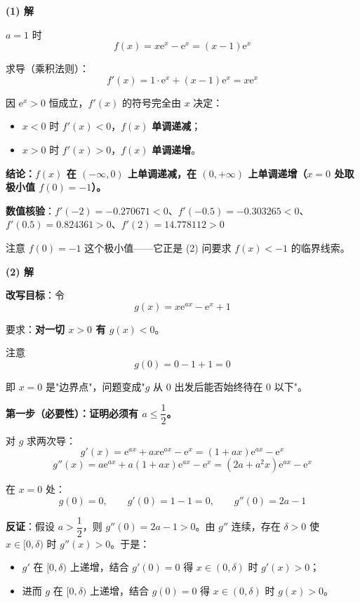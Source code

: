 \par\medskip

\textbf{(1) 解}

$a=1$ 时
\[f(x)=x\mathrm e^{x}-\mathrm e^{x}=(x-1)\mathrm e^{x}\]

求导（乘积法则）：
\[f'(x)=1\cdot\mathrm e^{x}+(x-1)\mathrm e^{x}=x\mathrm e^{x}\]

因 $\mathrm e^{x}>0$ 恒成立，$f'(x)$ 的符号完全由 $x$ 决定：

\begin{itemize}
\item $x<0$ 时 $f'(x)<0$，$f(x)$ \textbf{单调递减}；
\item $x>0$ 时 $f'(x)>0$，$f(x)$ \textbf{单调递增}。
\end{itemize}

\textbf{结论：$f(x)$ 在 $(-\infty,0)$ 上单调递减，在 $(0,+\infty)$ 上单调递增（$x=0$ 处取极小值 $f(0)=-1$）。}

\textbf{数值核验}：$f'(-2)=-0.270671<0$、$f'(-0.5)=-0.303265<0$、$f'(0.5)=0.824361>0$、$f'(2)=14.778112>0$ 

\begin{gktip}
注意 $f(0)=-1$ 这个极小值——它正是 (2) 问要求 $f(x)<-1$ 的临界线索。
\end{gktip}

\par\medskip

\textbf{(2) 解}

\textbf{改写目标}：令
\[g(x)=x\mathrm e^{ax}-\mathrm e^{x}+1\]

要求：\textbf{对一切 $x>0$ 有 $g(x)<0$}。

注意
\[g(0)=0-1+1=0\]

即 $x=0$ 是"边界点"，问题变成"$g$ 从 $0$ 出发后能否始终待在 $0$ 以下"。

\par\medskip

\textbf{第一步（必要性）：证明必须有 $a\le\dfrac12$。}

对 $g$ 求两次导：
\[g'(x)=\mathrm e^{ax}+ax\mathrm e^{ax}-\mathrm e^{x}=(1+ax)\mathrm e^{ax}-\mathrm e^{x}\]
\[g''(x)=a\mathrm e^{ax}+a(1+ax)\mathrm e^{ax}-\mathrm e^{x}=\left(2a+a^{2}x\right)\mathrm e^{ax}-\mathrm e^{x}\]

在 $x=0$ 处：
\[g(0)=0,\qquad g'(0)=1-1=0,\qquad g''(0)=2a-1\]

\textbf{反证}：假设 $a>\dfrac12$，则 $g''(0)=2a-1>0$。由 $g''$ 连续，存在 $\delta>0$ 使 $x\in[0,\delta)$ 时 $g''(x)>0$。于是：

\begin{itemize}
\item $g'$ 在 $[0,\delta)$ 上递增，结合 $g'(0)=0$ 得 $x\in(0,\delta)$ 时 $g'(x)>0$；
\item 进而 $g$ 在 $[0,\delta)$ 上递增，结合 $g(0)=0$ 得 $x\in(0,\delta)$ 时 $g(x)>0$。
\end{itemize}

